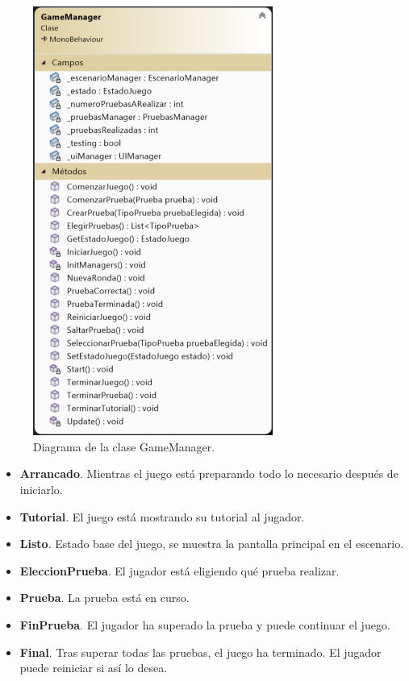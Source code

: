 \begin{figure}
	\centering
	\includegraphics[width=0.7\textwidth]{04.Desarrollo/05.Entrega5/01.Iteracion5_1/00.Figuras/11.game_manager_diagrama.png}
	\caption{Diagrama de la clase GameManager.}
	\label{fig:gmDiagrama}
\end{figure}


\begin{itemize}
	\item {\textbf{Arrancado}. Mientras el juego está preparando todo lo necesario después de iniciarlo.}
	\item {\textbf{Tutorial}. El juego está mostrando su tutorial al jugador.}
	\item {\textbf{Listo}. Estado base del juego, se muestra la pantalla principal en el escenario.}
	\item {\textbf{EleccionPrueba}. El jugador está eligiendo qué prueba realizar.}
	\item {\textbf{Prueba}. La prueba está en curso.}
	\item {\textbf{FinPrueba}. El jugador ha superado la prueba y puede continuar el juego.}
	\item {\textbf{Final}. Tras superar todas las pruebas, el juego ha terminado. El jugador puede reiniciar si así lo desea.}
\end{itemize}

